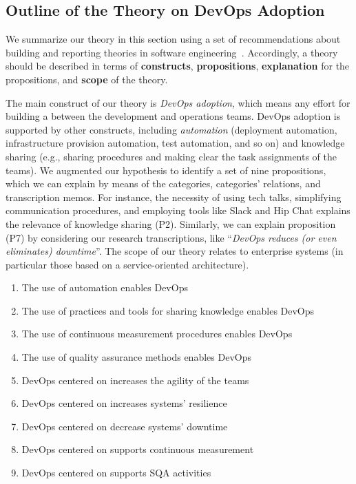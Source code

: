 \subsection{Outline of the Theory on DevOps Adoption}

We summarize our theory in this section using a 
set of recommendations about building and reporting
theories in software engineering~\cite{sjoberg2008}.
Accordingly, a theory should be described in
terms of {\bf constructs},
{\bf propositions}, {\bf explanation} for the propositions,
and {\bf scope} of the theory.

The main construct of our theory is \emph{DevOps adoption},
which means any effort for building a \cc between
the development and operations teams. DevOps adoption is
supported by other constructs, including \emph{automation}
(deployment automation, infrastructure provision automation,
test automation, and so on) and knowledge sharing (e.g.,
sharing procedures and making clear the task assignments
of the teams). We augmented our hypothesis to identify
a set of nine propositions, which we can explain
by means of the categories, categories' relations,
and transcription memos. For instance, the necessity of
using tech talks, simplifying communication procedures, and employing
tools like Slack and Hip Chat explains the relevance of knowledge sharing
(P2). Similarly, we can explain proposition (P7) by 
considering our research transcriptions, like
``\emph{DevOps reduces (or even eliminates) downtime}''.
The scope of our theory relates to
enterprise systems (in particular those based on
a service-oriented architecture). 


\begin{enumerate}[(P1)]
 \item The use of automation enables DevOps
 \item The use of practices and tools for sharing knowledge enables DevOps
 \item The use of continuous measurement procedures enables DevOps
 \item The use of quality assurance methods enables DevOps
 \item DevOps centered on \cc increases the agility of the teams
 \item DevOps centered on \cc increases systems' resilience 
 \item DevOps centered on \cc decrease systems'  downtime
 \item DevOps centered on \cc supports continuous measurement 
 \item DevOps centered on \cc supports SQA activities   
\end{enumerate}

